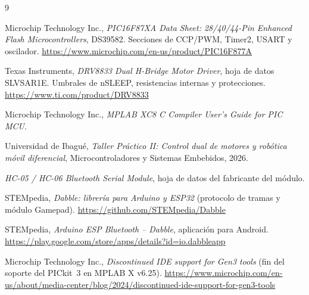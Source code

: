 \begin{thebibliography}{9}

Microchip Technology Inc., \emph{PIC16F87XA Data Sheet: 28/40/44-Pin Enhanced
Flash Microcontrollers}, DS39582. Secciones de CCP/PWM, Timer2, USART y
oscilador. \url{https://www.microchip.com/en-us/product/PIC16F877A}

Texas Instruments, \emph{DRV8833 Dual H-Bridge Motor Driver}, hoja de datos
SLVSAR1E. Umbrales de nSLEEP, resistencias internas y protecciones.
\url{https://www.ti.com/product/DRV8833}

Microchip Technology Inc., \emph{MPLAB XC8 C Compiler User's Guide for PIC
MCU}.

Universidad de Ibagué, \emph{Taller Práctico II: Control dual de motores y
robótica móvil diferencial}, Microcontroladores y Sistemas Embebidos, 2026.

\emph{HC-05 / HC-06 Bluetooth Serial Module}, hoja de datos del fabricante del
módulo.

STEMpedia, \emph{Dabble: librería para Arduino y ESP32} (protocolo de tramas
y módulo Gamepad). \url{https://github.com/STEMpedia/Dabble}

STEMpedia, \emph{Arduino ESP Bluetooth -- Dabble}, aplicación para Android.
\url{https://play.google.com/store/apps/details?id=io.dabbleapp}

Microchip Technology Inc., \emph{Discontinued IDE support for Gen3 tools}
(fin del soporte del PICkit~3 en MPLAB X v6.25).
\url{https://www.microchip.com/en-us/about/media-center/blog/2024/discontinued-ide-support-for-gen3-tools}

\end{thebibliography}
